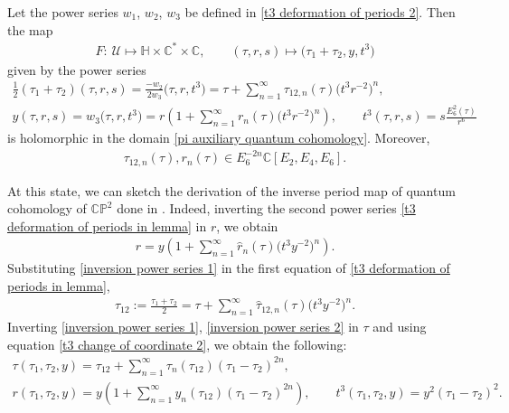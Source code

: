 \begin{Corollary}\label{lemma Milanov deformation corollary}
Let the power series $w_1$, $w_2$, $w_3$ be defined in \eqref{t3 deformation of periods 2}. Then the map
\begin{gather}\label{change of coordinate tau,r,s to tau1,tau2,t3}
 F\colon\ \mathcal{U}\mapsto \mathbb{H}\times \mathbb{C}^{*}\times \mathbb{C}, \qquad (\tau,r,s)\mapsto \bigl(\tau_1+\tau_2,y, t^3\bigr)
 \end{gather}
given by the power series
\begin{gather}
\frac{1}{2}(\tau_1+\tau_2)(\tau,r,s)=\frac{-w_2}{2w_3}\bigl(\tau,r,t^3\bigr)=\tau+\sum_{n=1}^{\infty} \tau_{12,n}(\tau) \bigl(t^3r^{-2}\bigr)^n ,\nonumber\\
y(\tau,r,s)=w_3\bigl(\tau,r,t^3\bigr)=r\left( 1+\sum_{n=1}^{\infty} r_n(\tau)\bigl(t^3r^{-2}\bigr)^n \right),\qquad
t^3(\tau,r,s)=s\frac{E_6^2(\tau)}{r^6}\label{t3 deformation of periods in lemma}
\end{gather}
 is holomorphic in the domain \eqref{pi auxiliary quantum cohomology}.
 Moreover,
\begin{gather}\label{coefficients of tau12 inside corollary Milanov}
 \tau_{12,n}(\tau) ,r_n(\tau) \in E_6^{-2n}\mathbb{C}[ E_2,E_4,E_6] .
\end{gather}
\end{Corollary}

At this state, we can sketch the derivation of the inverse period map of quantum cohomology of $\mathbb{CP}^2$ done in \cite[Section 5.4]{Milanov}. Indeed, inverting the second power series \eqref{t3 deformation of periods in lemma} in $r$, we obtain
\begin{gather}
r=y\left( 1+\sum_{n=1}^{\infty} \hat r_n(\tau)\bigl(t^3y^{-2}\bigr)^n \right).\label{inversion power series 1}
\end{gather}
Substituting \eqref{inversion power series 1} in the first equation of \eqref{t3 deformation of periods in lemma},
\begin{gather}\label{inversion power series 2}
\tau_{12}:=\frac{\tau_1+\tau_2}{2}=\tau+\sum_{n=1}^{\infty} \hat\tau_{12,n}(\tau) \bigl(t^3y^{-2}\bigr)^n .
\end{gather}
Inverting \eqref{inversion power series 1}, \eqref{inversion power series 2} in $\tau$ and using equation \eqref{t3 change of coordinate 2}, we obtain the following:
\begin{gather}
\tau(\tau_1,\tau_2,y)=\tau_{12}+\sum_{n=1}^{\infty} \tau_{n}(\tau_{12}) (\tau_1-\tau_2)^{2n} ,\nonumber\\
r(\tau_1,\tau_2,y)=y\left( 1+\sum_{n=1}^{\infty} y_n(\tau_{12})(\tau_1-\tau_2)^{2n} \right),\qquad
t^3(\tau_1,\tau_2,y)=y^2(\tau_1-\tau_2)^2.\label{t3 deformation of periods to compose}
\end{gather}



